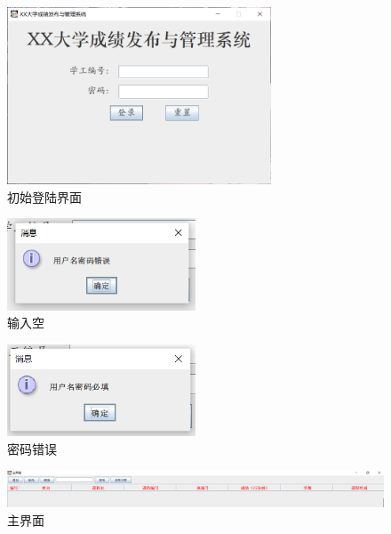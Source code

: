 \documentclass[12pt, a4paper, oneside]{ctexart}
\begin{document}
\begin{figure}[H]
    \centering
    \includegraphics[width = 0.7\textwidth]{../pic/3/3.0.png}
    \caption{初始登陆界面}
\end{figure}

\begin{figure}[H]
    \centering
    \includegraphics[width = 0.5\textwidth]{../pic/3/3.1.png}
    \caption{输入空}
\end{figure}

\begin{figure}[H]
    \centering
    \includegraphics[width = 0.5\textwidth]{../pic/3/3.2.png}
    \caption{密码错误}
\end{figure}

\begin{figure}[H]
    \centering
    \includegraphics[width = 1\textwidth]{../pic/3/3.3.png}
    \caption{主界面}
\end{figure}
\end{document}

